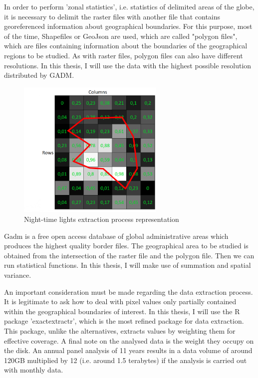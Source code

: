 In order to perform 'zonal statistics', i.e. statistics of delimited areas of the globe, it is necessary to delimit the raster files with another file that contains georeferenced information about geographical boundaries. For this purpose, most of the time, Shapefiles or GeoJson are used, which are called "polygon files", which are files containing information about the boundaries of the geographical regions to be studied. As with raster files, polygon files can also have different resolutions. In this thesis, I will use the data with the highest possible resolution distributed by GADM.
\begin{figure}[h]
    \begin{center}
    \includegraphics[width=7cm]{images/raster_night_cover.png}
    \end{center}
    \caption{Night-time lights extraction process representation}
\end{figure}
Gadm is a free open access database of global administrative areas which produces the highest quality border files.
The geographical area to be studied is obtained from the intersection of the raster file and the polygon file. Then we can run statistical functions. In this thesis, I will make use of summation and spatial variance.

An important consideration must be made regarding the data extraction process. It is legitimate to ask how to deal with pixel values only partially contained within the geographical boundaries of interest. In this thesis, I will use the R package 'exactextractr', which is the most refined package for data extraction. This package, unlike the alternatives, extracts values by weighting them for effective coverage. 
A final note on the analysed data is the weight they occupy on the disk. An annual panel analysis of 11 years results in a data volume of around 120GB multiplied by 12 (i.e. around 1.5 terabytes) if the analysis is carried out with monthly data. 

